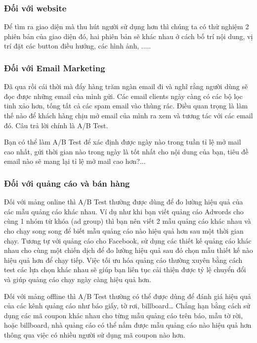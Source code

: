 \subsubsection{Đối với website}

Để tìm ra giao diện mà thu hút người sử dụng hơn thì chúng ta có thử nghiệm 2 phiên bản của giao diện đó, hai phiên bản sẽ khác nhau ở cách bố trí nội dung, vị trí đặt các button điều hướng, các hình ảnh, .....

\subsubsection{Đối với Email Marketing}

Đã qua rồi cái thời mà đẩy hàng trăm ngàn email đi và nghĩ rằng người dùng sẽ đọc được những email của mình gửi. Các email clients ngày càng có các bộ lọc tinh xảo hơn, tống tất cả các spam email vào thùng rác. Điều quan trọng là làm thế nào để khách hàng chịu mở email của mình ra xem và tương tác với các email đó. Câu trả lời chính là A/B Test.

Bạn có thể làm A/B Test để xác định được ngày nào trong tuần tỉ lệ mở mail cao nhất, gửi thời gian nào trong ngày là tốt nhất cho nội dung của bạn, tiêu đề email nào sẽ mang lại tỉ lệ mở mail cao hơn?...

\subsubsection{Đối với quảng cáo và bán hàng}

Đối với mảng online thì A/B Test thường được dùng để đo lường hiệu quả của các mẫu quảng cáo khác nhau. Ví dụ như khi bạn viết quảng cáo Adwords cho cùng 1 nhóm từ khóa (ad group) thì bạn nên viết 2 mẫu quảng cáo khác nhau và cho chạy song song để biết mẫu quảng cáo nào hiệu quả hơn sau một thời gian chạy. Tương tự với quảng cáo cho Facebook, sử dụng các thiết kế quảng cáo khác nhau cho cùng một chiến dịch để đo lường hiệu quả sau đó chọn mẫu thiết kế nào hiệu quả hơn để chạy tiếp. Việc tối ưu hóa quảng cáo thường xuyên bằng cách test các lựa chọn khác nhau sẽ giúp bạn liên tục cải thiện được tỷ lệ chuyển đổi và giúp quảng cáo chạy ngày càng hiệu quả hơn.

Đối với mảng offline thì A/B Test thường có thể được dùng để đánh giá hiệu quả của các kênh quảng cáo như báo giấy, tờ rơi, billboard… Chẳng hạn bằng cách sử dụng các mã coupon khác nhau cho từng mẫu quảng cáo trên báo, mẫu tờ rời, hoặc billboard, nhà quảng cáo có thể nắm được mẫu quảng cáo nào hiệu quả hơn thông qua việc có nhiều người sử dụng mã coupon nào hơn.

